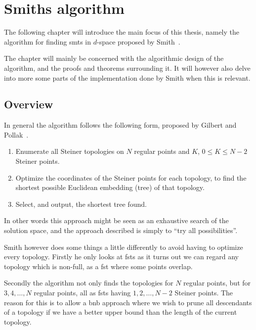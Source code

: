 {
\abnormalparskip{0pt}
\chapter{Smiths algorithm}
\label{ch:algorithm}
}


The following chapter will introduce the main focus of this thesis, namely the
algorithm for finding \glspl{smt} in $d$-space proposed by
Smith~\cite{Smith1992}.

The chapter will mainly be concerned with the algorithmic design of the
algorithm, and the proofs and theorems surrounding it. It will however also
delve into more some parts of the implementation done by Smith when this is
relevant.

\section{Overview}
\label{sec:overview}

In general the algorithm follows the following form, proposed by Gilbert and
Pollak~\cite{Gilbert1968}.

\begin{enumerate}
\item Enumerate all Steiner topologies on $N$ regular points and $K$, $0 \le K
  \le N-2$ Steiner points.
\item Optimize the coordinates of the Steiner points for each topology, to find
  the shortest possible Euclidean embedding (tree) of that topology.
\item Select, and output, the shortest tree found.
\end{enumerate}

In other words this approach might be seen as an exhaustive search of the
solution space, and the approach described is simply to ``try all
possibilities''.

Smith however does some things a little differently to avoid having to optimize
every topology. Firstly he only looks at \glspl{fst} as it turns out we can
regard any topology which is non-full, as a \gls{fst} where some points overlap.

Secondly the algorithm not only finds the topologies for $N$ regular points, but
for $3, 4, \ldots, N$ regular points, all as \glspl{fst} having
$1, 2, \ldots, N-2$ Steiner points. The reason for this is to allow a \gls{bnb}
approach where we wish to prune all descendants of a topology if we have a
better upper bound than the length of the current topology.

